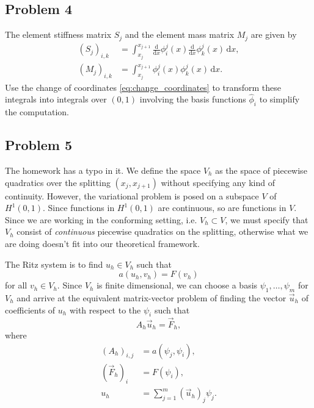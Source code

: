 \documentclass{article}
\theoremstyle{definition}
\theoremstyle{plain}
\theoremstyle{remark}
\begin{document}
\subsection{Problem 4}
The element stiffness matrix $S_j$ and the element mass matrix $M_j$ are given by
\begin{align}
(S_j)_{i,k} & = \int_{x_j}^{x_{j+1}}\frac{\mathrm d}{\mathrm dx}\phi_i^j(x)\frac{\mathrm d}{\mathrm dx}\phi_k^j(x)\,\mathrm dx, \\
(M_j)_{i,k} & = \int_{x_j}^{x_{j+1}}\phi_i^j(x)\phi_k^j(x)\,\mathrm dx.
\end{align}
Use the change of coordinates \eqref{eq:change_coordinates} to transform these integrals into integrals over $(0,1)$ involving the basis functions $\widehat \phi_i$ to simplify the computation.

\subsection{Problem 5}
The homework has a typo in it.
We define the space $V_h$ as the space of piecewise quadratics over the splitting $(x_j, x_{j+1})$ without specifying any kind of continuity.
However, the variational problem is posed on a subspace $V$ of $H^1(0,1)$.
Since functions in $H^1(0,1)$ are continuous, so are functions in $V$.
Since we are working in the conforming setting, i.e. $V_h \subset V$, we must specify that $V_h$ consist of \emph{continuous} piecewise quadratics on the splitting, otherwise what we are doing doesn't fit into our theoretical framework.

The Ritz system is to find $u_h \in V_h$ such that \[a(u_h,v_h) = F(v_h)\] for all $v_h \in V_h$.
Since $V_h$ is finite dimensional, we can choose a basis $\psi_1,\dots,\psi_m$ for $V_h$ and arrive at the equivalent matrix-vector problem of finding the vector $\vec u_h$ of coefficients of $u_h$ with respect to the $\psi_i$ such that 
\begin{equation}\label{eq:ritz}
  A_h\vec u_h = \vec F_h,
\end{equation}
where 
\begin{align}
  (A_h)_{i,j} & = a(\psi_j,\psi_i), \\
  \label{eq:right} (\vec F_h)_i & = F(\psi_i), \\
  u_h & = \sum_{j=1}^m (\vec u_h)_j \psi_j.
\end{align}
\end{document}
